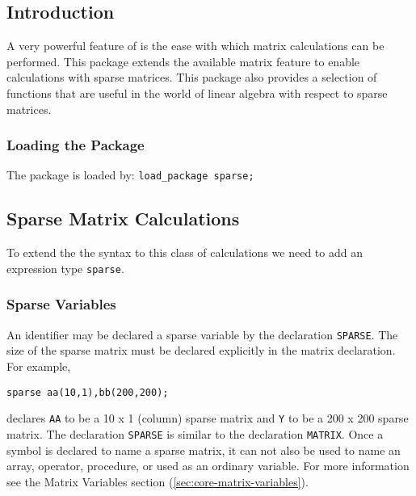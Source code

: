 

\newcommand\sparselineqlist {lin\_eqn$_{1}$,lin\_eqn$_{2}$, \ldots ,lin\_eqn$_{n}$}
\newcommand\sparsematlist   {mat$_{1}$,mat$_{2}$, \ldots ,mat$_{n}$}
\newcommand\sparseveclist   {vec$_{1}$,vec$_{2}$, \ldots ,vec$_{n}$}

\newcommand\sparselazyfootnote{\footnote{The \{\}'s can be omitted.}}


\subsection{Introduction}
A very powerful feature of \REDUCE{} is the ease with which matrix 
calculations can be performed.
This package extends the available matrix feature to enable calculations
with sparse matrices. This package also provides a selection of 
functions that are useful in the world of linear algebra with respect to
sparse matrices.

\subsubsection*{Loading the Package}
The package is loaded by: \texttt{load\_package sparse;}

\subsection{Sparse Matrix Calculations}
To extend the the syntax to this class of calculations we need to add an
expression type \texttt{sparse}.

\subsubsection{Sparse Variables}
An identifier may be declared a sparse variable by the declaration
\texttt{SPARSE}.
The size of the sparse matrix must be declared explicitly in the matrix
declaration. For example,
\begin{verbatim}
sparse aa(10,1),bb(200,200);
\end{verbatim}
declares \texttt{AA} to be a 10 x 1 (column) sparse matrix and \texttt{Y} to 
be a 200 x 200 sparse matrix.
The declaration \texttt{SPARSE} is similar to the declaration \texttt{MATRIX}.
Once a symbol is declared to name a sparse matrix, it can not also be 
used to name an array, operator, procedure, or used as an ordinary 
variable. For more information see the Matrix Variables
section (\ref{sec:core-matrix-variables}).

